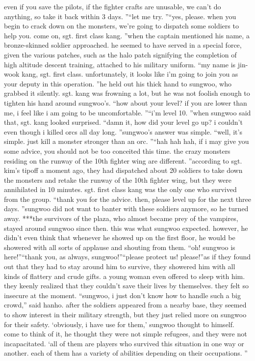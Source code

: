  even if you save the pilots, if the fighter crafts are unusable, we can’t do anything, so take it back within 3 days.
”“let me try.
”“yes, please.
 when you begin to crack down on the monsters, we’re going to dispatch some soldiers to help you.
 come on, sgt.
 first class kang.
”when the captain mentioned his name, a bronze-skinned soldier approached.
he seemed to have served in a special force, given the various patches, such as the halo patch signifying the completion of high altitude descent training, attached to his military uniform.
“my name is jin-wook kang, sgt.
 first class.
 unfortunately, it looks like i’m going to join you as your deputy in this operation.
”he held out his thick hand to sungwoo, who grabbed it silently.
 sgt.
 kang was frowning a lot, but he was not foolish enough to tighten his hand around sungwoo’s.
“how about your level? if you are lower than me, i feel like i am going to be uncomfortable.
”“i’m level 10.
”when sungwoo said that, sgt.
 kang looked surprised.
“damn it, how did your level go up? i couldn’t even though i killed orcs all day long.
”sungwoo’s answer was simple.
“well, it’s simple.
 just kill a monster stronger than an orc.
”“hah hah hah, if i may give you some advice, you should not be too conceited this time.
 the crazy monsters residing on the runway of the 10th fighter wing are different.
”according to sgt.
 kim’s tipoff a moment ago, they had dispatched about 20 soldiers to take down the monsters and retake the runway of the 10th fighter wing, but they were annihilated in 10 minutes.
 sgt.
 first class kang was the only one who survived from the group.
“thank you for the advice.
 then, please level up for the next three days.
”sungwoo did not want to banter with these soldiers anymore, so he turned away.
***the survivors of the plaza, who almost became prey of the vampires, stayed around sungwoo since then.
 this was what sungwoo expected.
however, he didn’t even think that whenever he showed up on the first floor, he would be showered with all sorts of applause and shouting from them.
“oh! sungwoo is here!”“thank you, as always, sungwoo!”“please protect us! please!”as if they found out that they had to stay around him to survive, they showered him with all kinds of flattery and crude gifts.
 a young woman even offered to sleep with him.
they keenly realized that they couldn’t save their lives by themselves.
they felt so insecure at the moment.
“sungwoo, i just don’t know how to handle such a big crowd,” said hanho.
after the soldiers appeared from a nearby base, they seemed to show interest in their military strength, but they just relied more on sungwoo for their safety.
‘obviously, i have use for them,’ sungwoo thought to himself.
come to think of it, he thought they were not simple refugees, and they were not incapacitated.
‘all of them are players who survived this situation in one way or another.
 each of them has a variety of abilities depending on their occupations.
”

